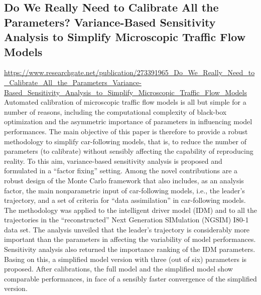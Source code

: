 \documentclass{article}
\begin{document}
\subsection*{Do We Really Need to Calibrate All the Parameters? Variance-Based Sensitivity Analysis to Simplify Microscopic Traffic Flow Models \label{}}
\url{https://www.researchgate.net/publication/273391965_Do_We_Really_Need_to_Calibrate_All_the_Parameters_Variance-Based_Sensitivity_Analysis_to_Simplify_Microscopic_Traffic_Flow_Models}
Automated calibration of microscopic traffic flow models is all but simple for a number of reasons, including the computational complexity of black-box optimization and the asymmetric importance of parameters in influencing model performances. The main objective of this paper is therefore to provide a robust methodology to simplify car-following models, that is, to reduce the number of parameters (to calibrate) without sensibly affecting the capability of reproducing reality. To this aim, variance-based sensitivity analysis is proposed and formulated in a “factor fixing” setting. Among the novel contributions are a robust design of the Monte Carlo framework that also includes, as an analysis factor, the main nonparametric input of car-following models, i.e., the leader's trajectory, and a set of criteria for “data assimilation” in car-following models. The methodology was applied to the intelligent driver model (IDM) and to all the trajectories in the “reconstructed” Next Generation SIMulation (NGSIM) I80-1 data set. The analysis unveiled that the leader's trajectory is considerably more important than the parameters in affecting the variability of model performances. Sensitivity analysis also returned the importance ranking of the IDM parameters. Basing on this, a simplified model version with three (out of six) parameters is proposed. After calibrations, the full model and the simplified model show comparable performances, in face of a sensibly faster convergence of the simplified version.
\end{document}
